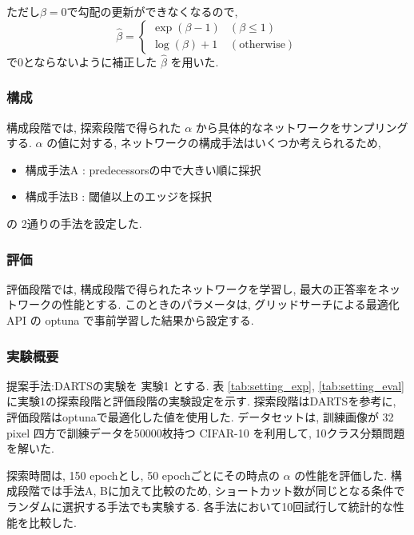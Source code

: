 ただし$\beta=0$で勾配の更新ができなくなるので,
\begin{equation}
  \label{equ:beta}
  \hat{\beta} = \begin{cases}
    \exp(\beta - 1) & (\beta \leq 1) \\
    \log(\beta) + 1 & (\mathrm{otherwise})
  \end{cases}
\end{equation}
で0とならないように補正した $\hat{\beta}$ を用いた.

\subsubsection{構成}

構成段階では, 探索段階で得られた $\alpha$ から具体的なネットワークをサンプリングする.
$\alpha$ の値に対する, ネットワークの構成手法はいくつか考えられるため,
\begin{itemize}
  \item 構成手法A : predecessorsの中で大きい順に採択
  \item 構成手法B : 閾値以上のエッジを採択
\end{itemize}
の 2通りの手法を設定した.

\subsubsection{評価}
評価段階では, 構成段階で得られたネットワークを学習し,
最大の正答率をネットワークの性能とする.
このときのパラメータは, グリッドサーチによる最適化API の optuna で事前学習した結果から設定する.


\changeindent{0cm}
\subsubsection{実験概要}
\label{sec:pred.01_03}
\changeindent{2cm}

提案手法:DARTSの実験を 実験1 とする.
表 \ref{tab:setting_exp}, \ref{tab:setting_eval} に実験1の探索段階と評価段階の実験設定を示す.
探索段階はDARTSを参考に, 評価段階はoptunaで最適化した値を使用した.
データセットは, 訓練画像が 32 pixel 四方で訓練データを50000枚持つ CIFAR-10\cite{cifar10} を利用して,
10クラス分類問題を解いた.

探索時間は, 150 epochとし, 50 epochごとにその時点の $\alpha$ の性能を評価した.
構成段階では手法A, Bに加えて比較のため,
ショートカット数が同じとなる条件でランダムに選択する手法でも実験する.
各手法において10回試行して統計的な性能を比較した.

